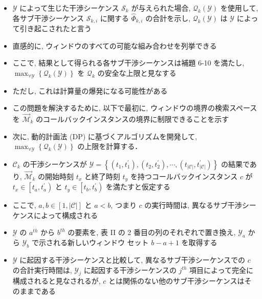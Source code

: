 \begin{frame}{}
    \begin{itemize}
        \item $\mathcal{Y}$ によって生じた干渉シーケンス $\mathcal{S}_{k}$ が与えられた場合, $\mathcal{Q}_{k}(\mathcal{Y})$ を使用して, 各サブ干渉シーケンス $\mathcal{S}_{k, i}$ に関する $\hat{\Phi}_{k, i}$ の合計を示し, $\mathcal{Q}_{k}(\mathcal{Y})$ は $\mathcal{Y}$ によって引き起こされたと言う
        \item 直感的に, ウィンドウのすべての可能な組み合わせを列挙できる
        \item ここで, 結果として得られる各サブ干渉シーケンスは補題 6-10 を満たし, $\max _{\forall \mathcal{Y}}\left\{\mathcal{Q}_{k}(\mathcal{Y})\right\}$ を $\mathcal{Q}_{k}$ の安全な上限と見なする
        \item ただし, これは計算量の爆発になる可能性がある
        \item この問題を解決するために, 以下で最初に, ウィンドウの境界の検索スペースを $\overrightarrow{\mathcal{M}}_{k}$ のコールバックインスタンスの境界に制限できることを示す
        \item 次に, 動的計画法 (DP) に基づくアルゴリズムを開発して, $\max _{\forall \mathcal{Y}}\left\{\mathcal{Q}_{k}(\mathcal{Y})\right\}$ の上限を計算する．
    \end{itemize}
\end{frame}

\begin{frame}{}
    \begin{itemize}
        \item $\mathcal{C}_{k}$ の干渉シーケンスが $\mathcal{Y}=\left\{\left(t_{1}, t_{1}^{\prime}\right),\left(t_{2}, t_{2}^{\prime}\right), \cdots,\left(t_{|\mathcal{C}|}, t_{|\mathcal{C}|}^{\prime}\right)\right\}$ の結果であり, $\overrightarrow{\mathcal{M}}_{k}$ の開始時刻 $t_{x}$ と終了時刻 $t_{y}$ を持つコールバックインスタンス $c$ が $t_{x} \in\left[t_{a}, t_{a}^{\prime}\right)$ と $t_{y} \in\left[t_{b}, t_{b}^{\prime}\right)$ を満たすと仮定する
        \item ここで, $a, b \in[1,|\mathcal{C}|]$ と $a<b$, つまり $c$ の実行時間は, 異なるサブ干渉シーケンスによって構成される
        \item $\mathcal{Y}$ の $a^{t h}$ から $b^{t h}$ の要素を, 表 II の 2 番目の列のそれぞれで置き換え, $\mathcal{Y}_{a}$ から $\mathcal{Y}_{b}$ で示される新しいウィンドウ セット $b-a+1$ を取得する
        \item $\mathcal{Y}$ に起因する干渉シーケンスと比較して, 異なるサブ干渉シーケンスでの $c$ の合計実行時間は, $\mathcal{Y}_{j}$ に起因する干渉シーケンスの $j^{t h}$ 項目によって完全に構成されると見なされるが, $c$ とは関係のない他のサブ干渉シーケンスはそのままである
    \end{itemize}
\end{frame}

